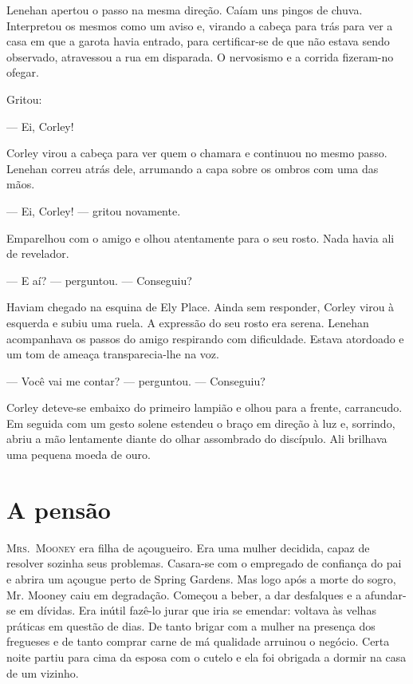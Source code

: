 Lenehan apertou o passo na mesma direção. Caíam uns pingos de chuva.
Interpretou os mesmos como um aviso e, virando a cabeça para trás para
ver a casa em que a garota havia entrado, para certificar-se de que
não estava sendo observado, atravessou a rua em disparada. O
nervosismo e a corrida fizeram-no ofegar.

Gritou:

--- Ei, Corley!

Corley virou a cabeça para ver quem o chamara e continuou no mesmo
passo. Lenehan correu atrás dele, arrumando a capa sobre os ombros com
uma das mãos.

--- Ei, Corley! --- gritou novamente.

Emparelhou com o amigo e olhou atentamente para o seu rosto. Nada
havia ali de revelador.

--- E aí? --- perguntou. --- Conseguiu?

Haviam chegado na esquina de Ely Place. Ainda sem responder, Corley
virou à esquerda e subiu uma ruela. A expressão do seu rosto era
serena. Lenehan acompanhava os passos do amigo
respirando com dificuldade. Estava atordoado e um tom de ameaça
transparecia-lhe na voz.

--- Você vai me contar? --- perguntou. --- Conseguiu?

Corley deteve-se embaixo do primeiro lampião e olhou para a frente,
carrancudo. Em seguida com um gesto solene estendeu o braço em direção
à luz e, sorrindo, abriu a mão lentamente diante do olhar assombrado
do discípulo. Ali brilhava uma pequena moeda de ouro.

\chapter{A pensão}

\textsc{Mrs.~Mooney} era filha de açougueiro. Era uma mulher decidida, capaz
de resolver sozinha seus problemas. Casara-se com o empregado de
confiança do pai e abrira um açougue perto de Spring Gardens. Mas logo
após a morte do sogro, Mr. Mooney caiu em degradação. Começou a beber,
a dar desfalques e a afundar-se em dívidas. Era inútil fazê-lo jurar
que iria se emendar: voltava às velhas práticas em questão de dias. De
tanto brigar com a mulher na presença dos fregueses e de tanto comprar
carne de má qualidade arruinou o negócio. Certa noite partiu para cima
da esposa com o cutelo e ela foi obrigada a dormir na casa de um
vizinho.

